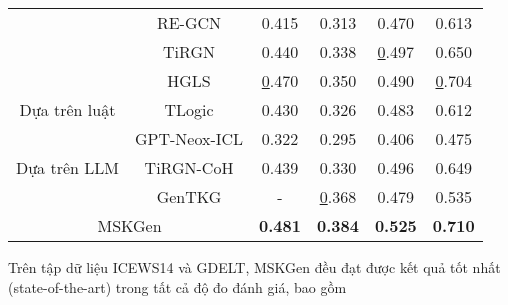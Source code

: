 \begin{table}
\begin{adjustbox}{width=\textwidth}
\begin{tabular}{|cc|cccc|}
\multicolumn{1}{|c|}{}                                 & RE-GCN                   & 0.415                    & 0.313                      & 0.470                      & 0.613          \\ \cline{2-2}
\multicolumn{1}{|c|}{}                                 & TiRGN                    & 0.440                    & 0.338                      & {\ul 0.497}                & 0.650          \\ \cline{2-2}
\multicolumn{1}{|c|}{}                                 & HGLS                     & {\ul 0.470}              & 0.350                      & 0.490                      & {\ul 0.704}    \\ \hline
\multicolumn{1}{|c|}{Dựa trên luật}                    & TLogic                   & 0.430                    & 0.326                      & 0.483                      & 0.612          \\ \hline
\multicolumn{1}{|c|}{\multirow{3}{*}{Dựa trên LLM}}    & GPT-Neox-ICL             & 0.322                    & 0.295                      & 0.406                      & 0.475          \\ \cline{2-2}
\multicolumn{1}{|c|}{}                                 & TiRGN-CoH                & 0.439                    & 0.330                      & 0.496                      & 0.649          \\ \cline{2-2}
\multicolumn{1}{|c|}{}                                 & GenTKG                   & -                        & {\ul 0.368}                & 0.479                      & 0.535          \\ \hline
\multicolumn{2}{|c|}{MSKGen}                                                      & \textbf{0.481}           & \textbf{0.384}             & \textbf{0.525}             & \textbf{0.710} \\ \hline
\end{tabular}
\end{adjustbox}  
\end{table}
\vspace{-5mm}

Trên tập dữ liệu ICEWS14 và GDELT, MSKGen đều đạt được kết quả tốt nhất (state-of-the-art) trong tất cả độ đo 
đánh giá, bao gồm 

